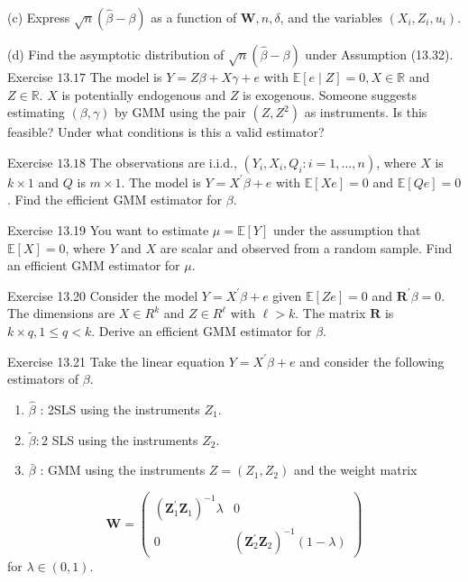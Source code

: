 \documentclass[10pt]{article}
\begin{document}
(c) Express $\sqrt{n}(\widehat{\beta}-\beta)$ as a function of $\boldsymbol{W}, n, \delta$, and the variables $\left(X_{i}, Z_{i}, u_{i}\right)$.

(d) Find the asymptotic distribution of $\sqrt{n}(\widehat{\beta}-\beta)$ under Assumption (13.32). Exercise $13.17$ The model is $Y=Z \beta+X \gamma+e$ with $\mathbb{E}[e \mid Z]=0, X \in \mathbb{R}$ and $Z \in \mathbb{R}$. $X$ is potentially endogenous and $Z$ is exogenous. Someone suggests estimating $(\beta, \gamma)$ by GMM using the pair $\left(Z, Z^{2}\right)$ as instruments. Is this feasible? Under what conditions is this a valid estimator?

Exercise $13.18$ The observations are i.i.d., $\left(Y_{i}, X_{i}, Q_{i}: i=1, \ldots, n\right)$, where $X$ is $k \times 1$ and $Q$ is $m \times 1$. The model is $Y=X^{\prime} \beta+e$ with $\mathbb{E}[X e]=0$ and $\mathbb{E}[Q e]=0$. Find the efficient GMM estimator for $\beta$.

Exercise 13.19 You want to estimate $\mu=\mathbb{E}[Y]$ under the assumption that $\mathbb{E}[X]=0$, where $Y$ and $X$ are scalar and observed from a random sample. Find an efficient GMM estimator for $\mu$.

Exercise 13.20 Consider the model $Y=X^{\prime} \beta+e$ given $\mathbb{E}[Z e]=0$ and $\boldsymbol{R}^{\prime} \beta=0$. The dimensions are $X \in R^{k}$ and $Z \in R^{\ell}$ with $\ell>k$. The matrix $\boldsymbol{R}$ is $k \times q, 1 \leq q<k$. Derive an efficient GMM estimator for $\beta$.

Exercise 13.21 Take the linear equation $Y=X^{\prime} \beta+e$ and consider the following estimators of $\beta$.

\begin{enumerate}
  \item $\widehat{\beta}$ : 2SLS using the instruments $Z_{1}$.

  \item $\widetilde{\beta}: 2$ SLS using the instruments $Z_{2}$.

  \item $\bar{\beta}$ : GMM using the instruments $Z=\left(Z_{1}, Z_{2}\right)$ and the weight matrix

\end{enumerate}
$$
\boldsymbol{W}=\left(\begin{array}{cc}
\left(\boldsymbol{Z}_{1}^{\prime} \boldsymbol{Z}_{1}\right)^{-1} \lambda & 0 \\
0 & \left(\boldsymbol{Z}_{2}^{\prime} \boldsymbol{Z}_{2}\right)^{-1}(1-\lambda)
\end{array}\right)
$$
for $\lambda \in(0,1)$.
\end{document}
